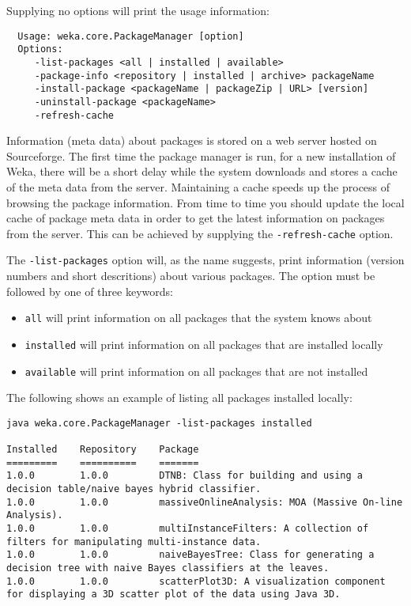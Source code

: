 Supplying no options will print the usage information:

{\scriptsize
\begin{verbatim}
  Usage: weka.core.PackageManager [option]
  Options:
     -list-packages <all | installed | available>
     -package-info <repository | installed | archive> packageName
     -install-package <packageName | packageZip | URL> [version]
     -uninstall-package <packageName>
     -refresh-cache
\end{verbatim}}

Information (meta data) about packages is stored on a web server
hosted on Sourceforge. The first time the package manager is run, for
a new installation of Weka, there will be a short delay while the
system downloads and stores a cache of the meta data from the
server. Maintaining a cache speeds up the process of browsing
the package information. From time to time you should update the
local cache of package meta data in order to get the latest information
on packages from the server. This can be achieved by supplying the
\texttt{-refresh-cache} option.

The \texttt{-list-packages} option will, as the name suggests, print
information (version numbers and short descritions) about various
packages. The option must be followed by one of three keywords:

\begin{itemize}
\item \texttt{all} will print information on all packages that the system knows about
\item \texttt{installed} will print information on all packages that are installed locally
\item \texttt{available} will print information on all packages that are not installed
\end{itemize}

The following shows an example of listing all packages installed locally:

{\scriptsize
\begin{verbatim}
java weka.core.PackageManager -list-packages installed

Installed    Repository    Package
=========    ==========    =======
1.0.0        1.0.0         DTNB: Class for building and using a decision table/naive bayes hybrid classifier.
1.0.0        1.0.0         massiveOnlineAnalysis: MOA (Massive On-line Analysis).
1.0.0        1.0.0         multiInstanceFilters: A collection of filters for manipulating multi-instance data.
1.0.0        1.0.0         naiveBayesTree: Class for generating a decision tree with naive Bayes classifiers at the leaves.
1.0.0        1.0.0         scatterPlot3D: A visualization component for displaying a 3D scatter plot of the data using Java 3D.
\end{verbatim}}

